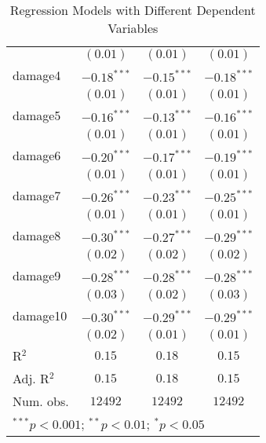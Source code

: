 \begin{table}
\begin{center}
\begin{tabular}{l c c c}
            & $(0.01)$      & $(0.01)$      & $(0.01)$      \\
damage4     & $-0.18^{***}$ & $-0.15^{***}$ & $-0.18^{***}$ \\
            & $(0.01)$      & $(0.01)$      & $(0.01)$      \\
damage5     & $-0.16^{***}$ & $-0.13^{***}$ & $-0.16^{***}$ \\
            & $(0.01)$      & $(0.01)$      & $(0.01)$      \\
damage6     & $-0.20^{***}$ & $-0.17^{***}$ & $-0.19^{***}$ \\
            & $(0.01)$      & $(0.01)$      & $(0.01)$      \\
damage7     & $-0.26^{***}$ & $-0.23^{***}$ & $-0.25^{***}$ \\
            & $(0.01)$      & $(0.01)$      & $(0.01)$      \\
damage8     & $-0.30^{***}$ & $-0.27^{***}$ & $-0.29^{***}$ \\
            & $(0.02)$      & $(0.02)$      & $(0.02)$      \\
damage9     & $-0.28^{***}$ & $-0.28^{***}$ & $-0.28^{***}$ \\
            & $(0.03)$      & $(0.02)$      & $(0.03)$      \\
damage10    & $-0.30^{***}$ & $-0.29^{***}$ & $-0.29^{***}$ \\
            & $(0.02)$      & $(0.01)$      & $(0.01)$      \\
\hline
R$^2$       & $0.15$        & $0.18$        & $0.15$        \\
Adj. R$^2$  & $0.15$        & $0.18$        & $0.15$        \\
Num. obs.   & $12492$       & $12492$       & $12492$       \\
\hline
\multicolumn{4}{l}{\scriptsize{$^{***}p<0.001$; $^{**}p<0.01$; $^{*}p<0.05$}}
\end{tabular}
\caption{Regression Models with Different Dependent Variables}
\label{tab:reg_by_dep_var}
\end{center}
\end{table}
